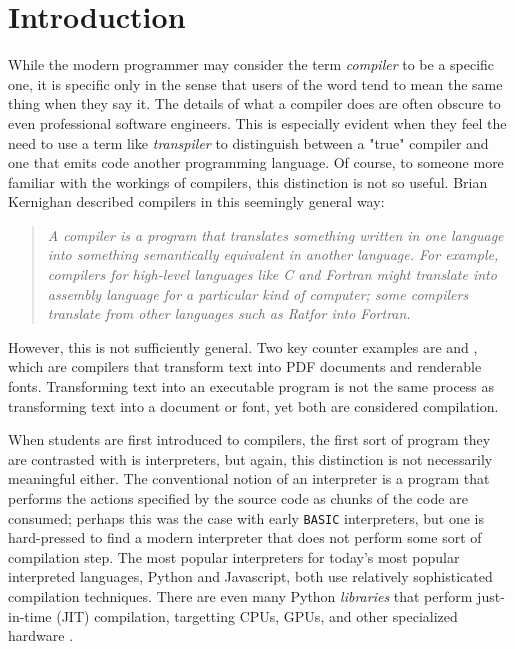 \chapter{Introduction}

While the modern programmer may consider the term \emph{compiler} to be a specific one, it is specific only in the
sense that users of the word tend to mean the same thing when they say it.
The details of what a compiler does are often obscure to even professional software engineers.
This is especially evident when they feel the need to use a term like \emph{transpiler} to distinguish between a
"true" compiler and one that emits code another programming language.
Of course, to someone more familiar with the workings of compilers, this distinction is not so useful.
Brian Kernighan described compilers in this seemingly general way\cite{new_history_of_modern_computing}:

\begin{quotation}
\textit{
A compiler is a program that translates something written in one language into something semantically equivalent in another language.
For example, compilers for high-level languages like C and Fortran might translate into assembly language for a particular kind of computer; some compilers translate from other languages such as Ratfor into Fortran.
}
\end{quotation}

However, this is not sufficiently general.
Two key counter examples are \tex and \metafont, which are compilers that
transform text into PDF documents and renderable fonts.
Transforming text into an executable program is not the same process as
transforming text into a document or font, yet both are considered compilation.

When students are first introduced to compilers, the first sort of program they are contrasted with is interpreters,
but again, this distinction is not necessarily meaningful either.
The conventional notion of an interpreter is a program that performs the actions
specified by the source code as chunks of the code are consumed;
perhaps this was the case with early \texttt{BASIC} interpreters, but one is hard-pressed
to find a modern interpreter that does not perform some sort of compilation step.
The most popular interpreters for today's most popular interpreted languages,
Python and Javascript, both use relatively sophisticated compilation techniques.
There are even many Python \textit{libraries} that perform
just-in-time (JIT) compilation, targetting CPUs, GPUs, and other specialized hardware
\cite{jax-compiler}\cite{lam_numba}\cite{numba_cuda}\cite{triton_tillet}.

